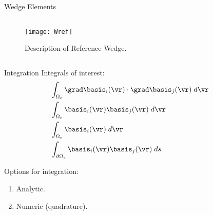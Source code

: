 \begin{frame}{Wedge Elements}
  \begin{columns}
    \begin{column}{0.5\textwidth}
      \vspace*{\fill}
      \begin{figure}
        \centering
        \texttt{[image: Wref]}
        \caption{Description of Reference Wedge.}
        \label{fig:Wref}
      \end{figure}
      \vspace*{\fill}
    \end{column}
    \begin{column}{0.5\textwidth}
      \begin{figure}
        \centering
        \hspace{0.1\textwidth}
        \label{fig:sketch_wedge}
      \end{figure}
    \end{column}
  \end{columns}
\end{frame}

\begin{frame}{Integration}
  Integrals of interest:
  \begin{align}
    &\int_{\Omega_e} \grad \basis_i(\vr) \cdot \grad \basis_j(\vr) 
      \;d\vr \\
    &\int_{\Omega_e} \basis_i(\vr) \basis_j(\vr) \;d\vr \\
    &\int_{\Omega_e} \basis_i(\vr) \;d\vr \\
    &\int_{\partial \Omega_e} \basis_i(\vr) \basis_j(\vr) \;ds &
  \end{align}

  Options for integration:
  \begin{enumerate}
    \item Analytic.
    \item Numeric (quadrature).
  \end{enumerate}
\end{frame}

